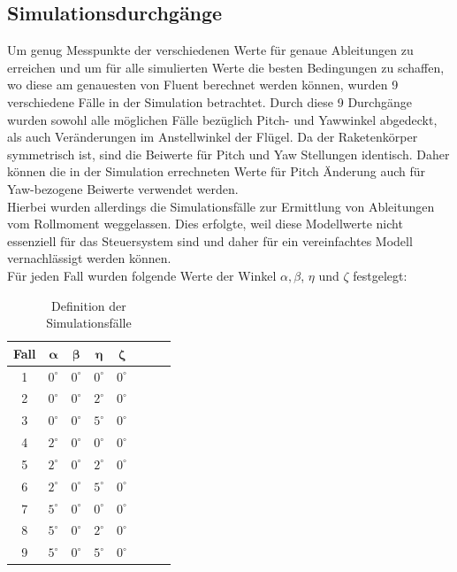 \subsection{Simulationsdurchgänge}
\label{subsec:sim_cases}
Um genug Messpunkte der verschiedenen Werte für genaue Ableitungen zu erreichen und um für alle simulierten Werte die besten Bedingungen zu schaffen, wo diese am genauesten von Fluent berechnet werden können, wurden 9 verschiedene Fälle in der Simulation betrachtet. Durch diese 9 Durchgänge wurden sowohl alle möglichen Fälle bezüglich Pitch- und Yawwinkel abgedeckt, als auch Veränderungen im Anstellwinkel der Flügel. Da der Raketenkörper symmetrisch ist, sind die Beiwerte für Pitch und Yaw Stellungen identisch. Daher können die in der Simulation errechneten Werte für Pitch Änderung auch für Yaw-bezogene Beiwerte verwendet werden.
\\
Hierbei wurden allerdings die Simulationsfälle zur Ermittlung von Ableitungen vom Rollmoment weggelassen. Dies erfolgte, weil diese Modellwerte nicht essenziell für das Steuersystem sind und daher für ein vereinfachtes Modell vernachlässigt werden können.
\\
Für jeden Fall wurden folgende Werte der Winkel $\alpha, \beta$, $\eta$ und $\zeta$ festgelegt:
\begin{table}[h]
    \centering
\begin{tabular}{|c|c|c|c|c|c|c|c|}
\hline
\textbf{Fall} & $\boldsymbol{\alpha}$ & $\boldsymbol{\beta}$ & $\boldsymbol{\eta}$ & $\boldsymbol{\zeta}$ \\ 
\hline
1 & $0^\circ$ & $0^\circ$ & $0^\circ$ & $0^\circ$ \\
2 & $0^\circ$ & $0^\circ$ & $2^\circ$ & $0^\circ$ \\
3 & $0^\circ$ & $0^\circ$ & $5^\circ$ & $0^\circ$ \\
4 & $2^\circ$ & $0^\circ$ & $0^\circ$ & $0^\circ$ \\
5 & $2^\circ$ & $0^\circ$ & $2^\circ$ & $0^\circ$ \\
6 & $2^\circ$ & $0^\circ$ & $5^\circ$ & $0^\circ$ \\
7 & $5^\circ$ & $0^\circ$ & $0^\circ$ & $0^\circ$ \\
8 & $5^\circ$ & $0^\circ$ & $2^\circ$ & $0^\circ$ \\
9 & $5^\circ$ & $0^\circ$ & $5^\circ$ & $0^\circ$ \\
\hline
\end{tabular} 
    \caption{Definition der Simulationsfälle}
    \label{tab:sim_cases}
\end{table}

